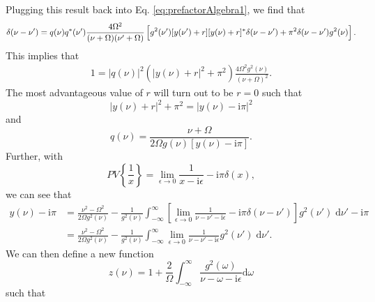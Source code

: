 \documentclass{article}
\begin{document}
Plugging this result back into Eq. \eqref{eq:prefactorAlgebra1}, we find that
\begin{equation}
\delta(\nu - \nu') = q(\nu)q^*(\nu')\frac{4\Omega^2}{(\nu + \Omega)(\nu' + \Omega)}\left[g^2(\nu')[y(\nu') + r][y(\nu) + r]^*\delta(\nu - \nu') + \pi^2\delta(\nu - \nu')g^2(\nu) \vphantom{\sum} \right].
\end{equation}
This implies that
\begin{equation}
\begin{split}
1 = |q(\nu)|^2(|y(\nu) + r|^2 + \pi^2)\frac{4\Omega^2g^2(\nu)}{(\nu + \Omega)^2}.
\end{split}
\end{equation}
The most advantageous value of $r$ will turn out to be $r = 0$ such that
\begin{equation}
|y(\nu) + r|^2 + \pi^2 = |y(\nu) - \mathrm{i}\pi|^2
\end{equation}
and
\begin{equation}
q(\nu) = \frac{\nu + \Omega}{2\Omega g(\nu)[y(\nu) - \mathrm{i}\pi]}.
\end{equation}
Further, with
\begin{equation}
PV\left\{\frac{1}{x}\right\} = \lim_{\epsilon\to0}\frac{1}{x - \mathrm{i}\epsilon} - \mathrm{i}\pi\delta(x),
\end{equation}
we can see that
\begin{equation}
\begin{split}
y(\nu) - \mathrm{i}\pi &= \frac{\nu^2 - \Omega^2}{2\Omega g^2(\nu)} - \frac{1}{g^2(\nu)}\int_{-\infty}^\infty\left[\lim_{\epsilon\to0}\frac{1}{\nu - \nu' - \mathrm{i}\epsilon} - \mathrm{i}\pi\delta(\nu - \nu')\right]g^2(\nu')\;\mathrm{d}\nu' - \mathrm{i}\pi\\
&= \frac{\nu^2 - \Omega^2}{2\Omega g^2(\nu)} - \frac{1}{g^2(\nu)}\int_{-\infty}^\infty\lim_{\epsilon\to0}\frac{1}{\nu - \nu' - \mathrm{i}\epsilon}g^2(\nu')\;\mathrm{d}\nu'.
\end{split}
\end{equation}
We can then define a new function
\begin{equation}
z(\nu) = 1 + \frac{2}{\Omega}\int_{-\infty}^\infty \frac{g^2(\omega)}{\nu - \omega - \mathrm{i}\epsilon}\mathrm{d}\omega
\end{equation}
such that
\end{document}
